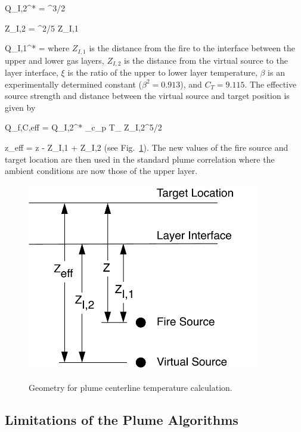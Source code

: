 \be Q_{I,2}^* = ^{3/2} \ee

\be Z_{I,2} = ^{2/5} Z_{I,1}  \ee

\be Q_{I,1}^* =   \ee
where $Z_{I,1}$ is the distance from the fire to the interface between the upper and lower gas layers, $Z_{I,2}$ is the distance from the virtual source to the layer interface, $\xi$ is the ratio of the upper to lower layer temperature, $\beta$ is an experimentally determined constant \cite{Zukoski:1981} ($\beta^2 = 0.913$), and $C_T = 9.115$.  The effective source strength and distance between the virtual source and target position is given by

\be Q_{f,C,eff} = Q_{I,2}^* \rho_\infty c_{p\infty} T_\infty {} Z_{I,2}^{5/2}  \ee

\be z_{eff} = z - Z_{I,1} + Z_{I,2} \ee
(see Fig.~\ref{fig:Plume_Temp_Notation}). The new values of the fire source and  target location are then used in the standard plume correlation where the ambient conditions are now those of the upper layer.
\begin{figure}
\begin{center}
\includegraphics[width=4.0in]{FIGURES/Theory/Plume_Temp_Notation}\\
\end{center}
\caption{Geometry for plume centerline temperature calculation.}
 \label{fig:Plume_Temp_Notation}
\end{figure}

\subsection{Limitations of the Plume Algorithms} \label{sec:plumelimits}

